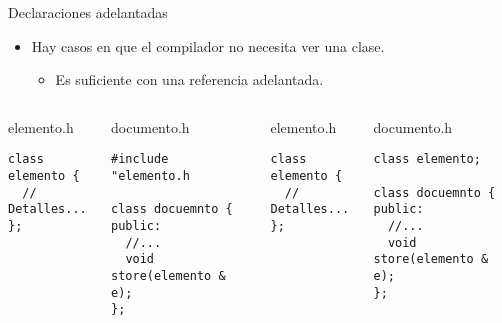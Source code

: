 \begin{frame}[t,fragile]{Declaraciones adelantadas}
\begin{itemize}
  \item Hay casos en que el compilador no necesita ver una clase.
    \begin{itemize}
      \item Es suficiente con una referencia adelantada.
    \end{itemize}
\end{itemize}
\begin{columns}

\begin{block}{elemento.h}
\begin{lstlisting}[basicstyle=\tiny\ttfamily]
class elemento {
  // Detalles...
};
\end{lstlisting}
\end{block}

\begin{block}{documento.h}
\begin{lstlisting}[basicstyle=\tiny\ttfamily]
#include "elemento.h

class docuemnto {
public:
  //...
  void store(elemento & e);
};
\end{lstlisting}
\end{block}

\pause
{}
\begin{block}{elemento.h}
\begin{lstlisting}[basicstyle=\tiny\ttfamily]
class elemento {
  // Detalles...
};
\end{lstlisting}
\end{block}

\begin{block}{documento.h}
\begin{lstlisting}[basicstyle=\tiny\ttfamily]
class elemento;

class docuemnto {
public:
  //...
  void store(elemento & e);
};
\end{lstlisting}
\end{block}


\end{columns}
\end{frame}

